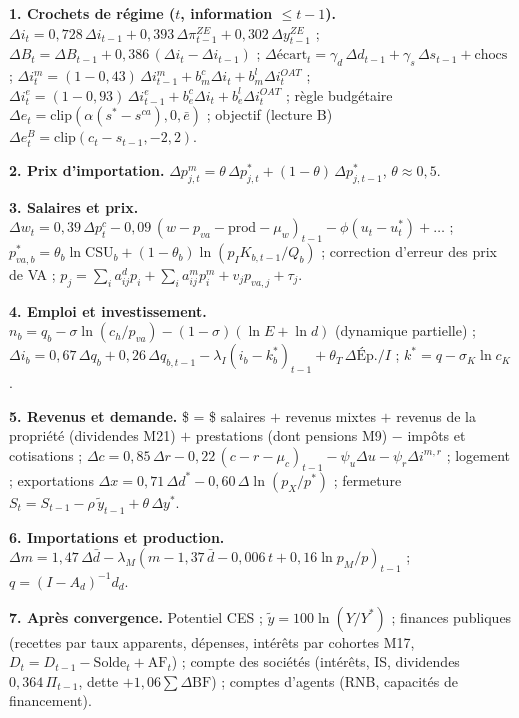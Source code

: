 \documentclass[
  11pt,
  11pt,
  a4paper,
  openany]{book}
\begin{document}
\textbf{1. Crochets de régime (\(t\), information \(\le t-1\)).}
\(\Delta i_t = 0{,}728\,\Delta i_{t-1} + 0{,}393\,\Delta\pi^{ZE}_{t-1} + 0{,}302\,\Delta y^{ZE}_{t-1}\)
;
\(\Delta B_t = \Delta B_{t-1} + 0{,}386\,(\Delta i_t - \Delta i_{t-1})\)
;
\(\Delta \text{écart}_t = \gamma_d\,\Delta d_{t-1} + \gamma_s\,\Delta s_{t-1} + \text{chocs}\)
;
\(\Delta i^m_t = (1 - 0{,}43)\,\Delta i^m_{t-1} + b^c_m \Delta i_t + b^l_m \Delta i^{OAT}_t\)
;
\(\Delta i^e_t = (1 - 0{,}93)\,\Delta i^e_{t-1} + b^c_e \Delta i_t + b^l_e \Delta i^{OAT}_t\)
; règle budgétaire
\(\Delta e_t = \text{clip}(\alpha(s^* - s^{ca}), 0, \bar e)\) ; objectif
(lecture B) \(\Delta e^B_t = \text{clip}(c_t - s_{t-1}, -2, 2)\).

\textbf{2. Prix d'importation.}
\(\Delta p^m_{j,t} = \theta\,\Delta p^{*}_{j,t} + (1-\theta)\,\Delta p^{*}_{j,t-1}\),
\(\theta \approx 0{,}5\).

\textbf{3. Salaires et prix.}
\(\Delta w_t = 0{,}39\,\Delta p^c_t - 0{,}09\,(w - p_{va} - \text{prod} - \mu_w)_{t-1} - \phi(u_t - u^*_t) + \dots\)
;
\(p^*_{va,b} = \theta_b \ln \text{CSU}_b + (1-\theta_b) \ln(p_I K_{b,t-1}/Q_b)\)
; correction d'erreur des prix de VA ;
\(p_j = \sum_i a^d_{ij} p_i + \sum_i a^m_{ij} p^m_i + v_j p_{va,j} + \tau_j\).

\textbf{4. Emploi et investissement.}
\(n_b = q_b - \sigma \ln(c_h/p_{va}) - (1-\sigma)(\ln E + \ln d)\)
(dynamique partielle) ;
\(\Delta i_b = 0{,}67\,\Delta q_b + 0{,}26\,\Delta q_{b,t-1} - \lambda_I(i_b - k^*_b)_{t-1} + \theta_T\,\Delta\text{Ép.}/I\)
; \(k^* = q - \sigma_K \ln c_K\).

\textbf{5. Revenus et demande.} \$ = \$ salaires \(+\) revenus
mixtes \(+\) revenus de la propriété (dividendes M21) \(+\) prestations
(dont pensions M9) \(-\) impôts et cotisations ;
\(\Delta c = 0{,}85\,\Delta r - 0{,}22\,(c - r - \mu_c)_{t-1} - \psi_u \Delta u - \psi_r \Delta i^{m,r}\)
; logement ; exportations
\(\Delta x = 0{,}71\,\Delta d^* - 0{,}60\,\Delta\ln(p_X/p^*)\) ;
fermeture \(S_t = S_{t-1} - \rho\,\tilde y_{t-1} + \theta\,\Delta y^*\).

\textbf{6. Importations et production.}
\(\Delta m = 1{,}47\,\Delta \bar d - \lambda_M(m - 1{,}37\,\bar d - 0{,}006\,t + 0{,}16 \ln p_M/p)_{t-1}\)
; \(q = (I - A_d)^{-1} d_d\).

\textbf{7. Après convergence.} Potentiel CES ;
\(\tilde y = 100\ln(Y/Y^*)\) ; finances publiques (recettes par taux
apparents, dépenses, intérêts par cohortes M17,
\(D_t = D_{t-1} - \text{Solde}_t + \text{AF}_t\)) ; compte des sociétés
(intérêts, IS, dividendes \(0{,}364\,\Pi_{t-1}\), dette
\(+1{,}06 \sum \Delta \text{BF}\)) ; comptes d'agents (RNB, capacités de
financement).
\end{document}
